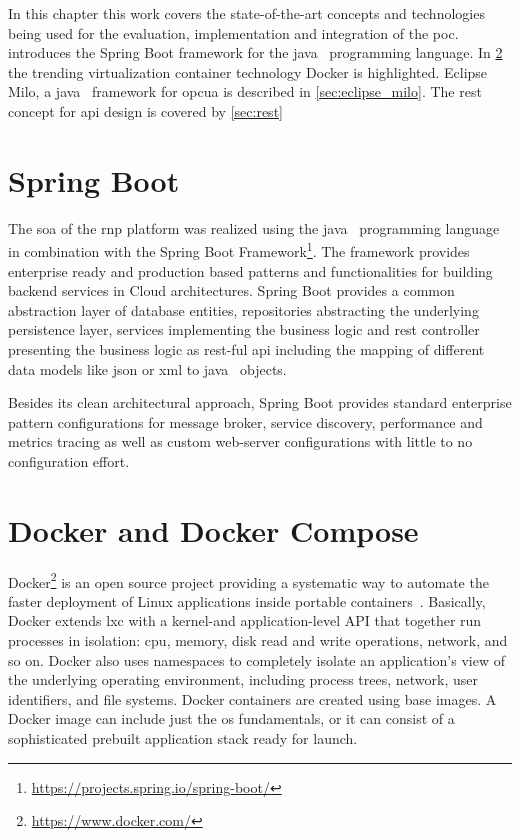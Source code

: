 \documentclass[
a4paper,
twoside,
headsepline,
cleardoublepage=empty,
parskip=half,
draft=false
]{scrbook}
\begin{document}
		In this chapter this work covers the state-of-the-art concepts and technologies being used for the evaluation, implementation and integration of the \gls{poc}.  introduces the Spring Boot framework for the \gls{java}~\cite{java2015} programming language. In \cref{sec:docker} the trending virtualization container technology Docker is highlighted. Eclipse Milo, a \gls{java}~\cite{java2015} framework for \gls{opcua} is described in \cref{sec:eclipse_milo}. The \gls{rest} concept for \gls{api} design is covered by \cref{sec:rest}

		\section{Spring Boot}\label{sec:spring_boot}

			The \gls{soa} of the \gls{rnp} platform was realized using the \gls{java}~\cite{java2015} programming language in combination with the Spring Boot Framework\footnote{\url{https://projects.spring.io/spring-boot/}}. The framework provides enterprise ready and production based patterns and functionalities for building backend services in Cloud architectures. Spring Boot provides a common abstraction layer of database entities, repositories abstracting the underlying persistence layer, services implementing the business logic and \gls{rest} controller presenting the business logic as \gls{rest}-ful \gls{api} including the mapping of different data models like \gls{json} or \gls{xml} to \gls{java}~\cite{java2015} objects.
			
			Besides its clean architectural approach, Spring Boot provides standard enterprise pattern configurations for message broker, service discovery, performance and metrics tracing as well as custom web-server configurations with little to no configuration effort.

		\section{Docker and Docker Compose}\label{sec:docker}
		
			Docker\footnote{\url{https://www.docker.com/}} is an open source project providing a systematic way to automate the faster deployment of Linux applications inside portable containers~\cite{bernstein2014containers}. 
			Basically, Docker extends \gls{lxc} with a kernel-and application-level API that together run processes in isolation: \gls{cpu}, memory, disk read and write operations, network, and so on. 
			Docker also uses namespaces to completely isolate an application’s view of the underlying operating environment, including process trees, network, user identifiers, and file systems.
			Docker containers are created using base images.
			A Docker image can include just the \gls{os} fundamentals, or it can consist of a sophisticated prebuilt application stack ready for launch. 
			
\end{document}
